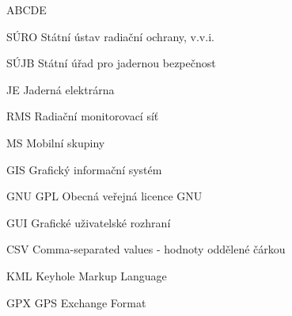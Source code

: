 
\begin{seznamzkratek}{ABCDE}
	
	      {SÚRO}
	      {Státní ústav radiační ochrany, v.v.i.}

	      {SÚJB}
	      {Státní úřad pro jadernou bezpečnost}
	      
		  {JE}
		  {Jaderná elektrárna}
	      
		  {RMS}
		  {Radiační monitorovací síť}
		  
		  {MS}
		  {Mobilní skupiny}

		  {GIS}
		  {Grafický informační systém}	
	
	      {GNU GPL}
	      {Obecná veřejná licence GNU}
	     
		  {GUI}
		  {Grafické uživatelské rozhraní}

		  {CSV}
		  {Comma-separated values - hodnoty oddělené čárkou}
		  
		  {KML}
		  {Keyhole Markup Language}
		  
		  {GPX}
		  {GPS Exchange Format}
		  
\end{seznamzkratek}